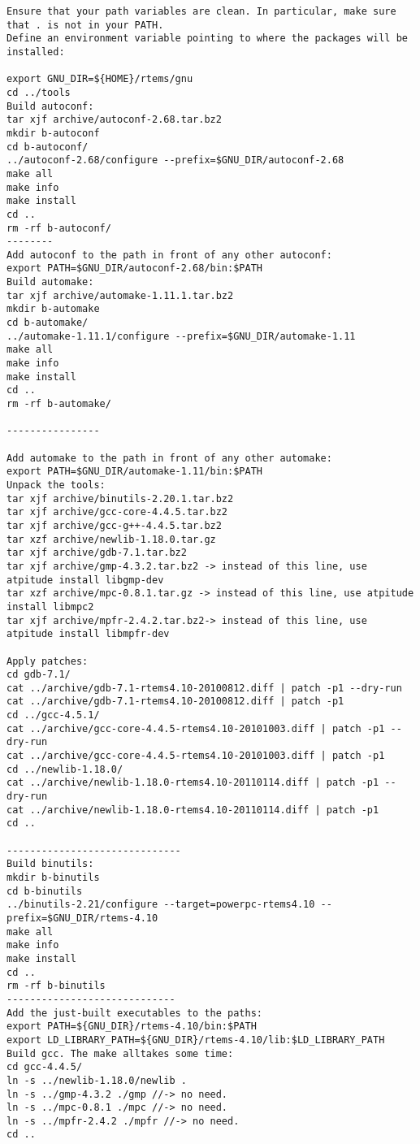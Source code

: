\documentclass[11pt
  , a4paper
  , article
  , oneside
]{memoir}
\begin{document}
\begin{lstlisting}[style=termstyle]
Ensure that your path variables are clean. In particular, make sure that . is not in your PATH.
Define an environment variable pointing to where the packages will be installed:

export GNU_DIR=${HOME}/rtems/gnu
cd ../tools
Build autoconf:
tar xjf archive/autoconf-2.68.tar.bz2
mkdir b-autoconf
cd b-autoconf/
../autoconf-2.68/configure --prefix=$GNU_DIR/autoconf-2.68
make all
make info
make install
cd ..
rm -rf b-autoconf/
--------
Add autoconf to the path in front of any other autoconf:
export PATH=$GNU_DIR/autoconf-2.68/bin:$PATH
Build automake:
tar xjf archive/automake-1.11.1.tar.bz2
mkdir b-automake
cd b-automake/
../automake-1.11.1/configure --prefix=$GNU_DIR/automake-1.11
make all
make info
make install
cd ..
rm -rf b-automake/

----------------

Add automake to the path in front of any other automake:
export PATH=$GNU_DIR/automake-1.11/bin:$PATH
Unpack the tools:
tar xjf archive/binutils-2.20.1.tar.bz2
tar xjf archive/gcc-core-4.4.5.tar.bz2
tar xjf archive/gcc-g++-4.4.5.tar.bz2
tar xzf archive/newlib-1.18.0.tar.gz
tar xjf archive/gdb-7.1.tar.bz2
tar xjf archive/gmp-4.3.2.tar.bz2 -> instead of this line, use atpitude install libgmp-dev
tar xzf archive/mpc-0.8.1.tar.gz -> instead of this line, use atpitude install libmpc2
tar xjf archive/mpfr-2.4.2.tar.bz2-> instead of this line, use atpitude install libmpfr-dev

Apply patches:
cd gdb-7.1/
cat ../archive/gdb-7.1-rtems4.10-20100812.diff | patch -p1 --dry-run
cat ../archive/gdb-7.1-rtems4.10-20100812.diff | patch -p1
cd ../gcc-4.5.1/
cat ../archive/gcc-core-4.4.5-rtems4.10-20101003.diff | patch -p1 --dry-run
cat ../archive/gcc-core-4.4.5-rtems4.10-20101003.diff | patch -p1
cd ../newlib-1.18.0/
cat ../archive/newlib-1.18.0-rtems4.10-20110114.diff | patch -p1 --dry-run
cat ../archive/newlib-1.18.0-rtems4.10-20110114.diff | patch -p1
cd ..

------------------------------
Build binutils:
mkdir b-binutils
cd b-binutils
../binutils-2.21/configure --target=powerpc-rtems4.10 --prefix=$GNU_DIR/rtems-4.10
make all
make info
make install
cd ..
rm -rf b-binutils
-----------------------------
Add the just-built executables to the paths:
export PATH=${GNU_DIR}/rtems-4.10/bin:$PATH
export LD_LIBRARY_PATH=${GNU_DIR}/rtems-4.10/lib:$LD_LIBRARY_PATH
Build gcc. The make alltakes some time:
cd gcc-4.4.5/
ln -s ../newlib-1.18.0/newlib .
ln -s ../gmp-4.3.2 ./gmp //-> no need.
ln -s ../mpc-0.8.1 ./mpc //-> no need.
ln -s ../mpfr-2.4.2 ./mpfr //-> no need.
cd ..


\end{lstlisting}
\end{document}
